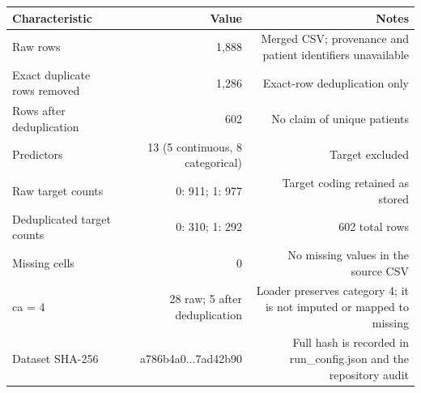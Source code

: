 \begin{tabular}{lrr}
\toprule
Characteristic & Value & Notes \\
\midrule
Raw rows & 1,888 & Merged CSV; provenance and patient identifiers unavailable \\
Exact duplicate rows removed & 1,286 & Exact-row deduplication only \\
Rows after deduplication & 602 & No claim of unique patients \\
Predictors & 13 (5 continuous, 8 categorical) & Target excluded \\
Raw target counts & 0: 911; 1: 977 & Target coding retained as stored \\
Deduplicated target counts & 0: 310; 1: 292 & 602 total rows \\
Missing cells & 0 & No missing values in the source CSV \\
ca = 4 & 28 raw; 5 after deduplication & Loader preserves category 4; it is not imputed or mapped to missing \\
Dataset SHA-256 & a786b4a0...7ad42b90 & Full hash is recorded in run\_config.json and the repository audit \\
\bottomrule
\end{tabular}

